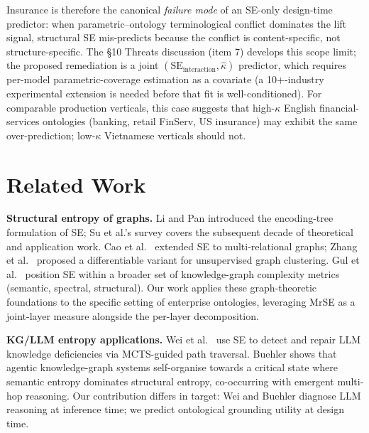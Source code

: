 \documentclass[11pt,a4paper]{article}
\newcommand{\se}{\mathrm{SE}}
\newcommand{\seint}{\se_{\text{interaction}}}
\newcommand{\kapp}{\kappa}
\begin{document}
Insurance is therefore the canonical \emph{failure mode} of an
SE-only design-time predictor: when parametric--ontology
terminological conflict dominates the lift signal, structural SE
mis-predicts because the conflict is content-specific, not
structure-specific. The §10 Threats discussion (item 7) develops
this scope limit; the proposed remediation is a joint $(\seint,
\hat{\kapp})$ predictor, which requires per-model parametric-coverage
estimation as a covariate (a 10+-industry experimental extension is
needed before that fit is well-conditioned). For comparable
production verticals, this case suggests that high-$\kapp$ English
financial-services ontologies (banking, retail FinServ, US insurance)
may exhibit the same over-prediction; low-$\kapp$ Vietnamese verticals
should not.

\section{Related Work}
\label{sec:related}

\textbf{Structural entropy of graphs.} Li and Pan \citep{li2016structural}
introduced the encoding-tree formulation of SE; Su et al.'s survey
\citep{su2025survey} covers the subsequent decade of theoretical and
application work. Cao et al.\ \citep{cao2024mrse} extended SE to
multi-relational graphs; Zhang et al.\ \citep{zhang2025dese} proposed a
differentiable variant for unsupervised graph clustering. Gul et al.\
\citep{gul2025kgcomplexity} position SE within a broader set of
knowledge-graph complexity metrics (semantic, spectral, structural).
Our work applies these graph-theoretic foundations to the specific
setting of enterprise ontologies, leveraging MrSE as a joint-layer
measure alongside the per-layer decomposition.

\textbf{KG/LLM entropy applications.} Wei et al.\ \citep{wei2025senator}
use SE to detect and repair LLM knowledge deficiencies via MCTS-guided
path traversal. Buehler \citep{buehler2025selforganizing} shows that
agentic knowledge-graph systems self-organise towards a critical state
where semantic entropy dominates structural entropy, co-occurring with
emergent multi-hop reasoning. Our contribution differs in target: Wei
and Buehler diagnose LLM reasoning at inference time; we predict
ontological grounding utility at design time.
\end{document}
